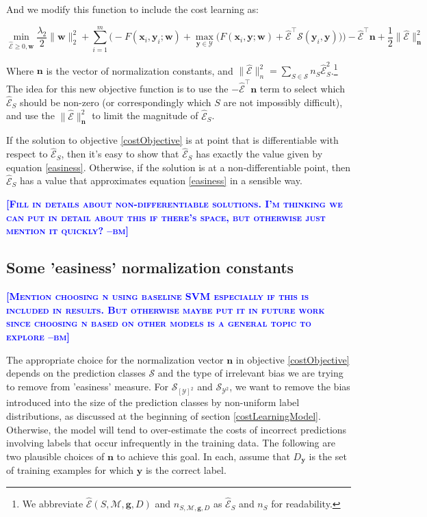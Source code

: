 \documentclass{article} %
\newcommand{\bmcomment}[1]{\textcolor{blue}{\textsc{\textbf{[#1 --bm]}}}}
\begin{document}
And we modify this function to include the cost learning as:

\begin{equation}
\label{costObjective}
\min_{\mathbf{\mathcal{\hat{E}}}\geq 0,\mathbf{w}} \frac{\lambda_2}{2}\|\mathbf{w}\|_2^2 + \sum_{i=1}^m\bigg(-F(\mathbf{x}_i,\mathbf{y}_i;\mathbf{w})+\max_{\mathbf{y}\in \mathcal{Y}}\Big(F(\mathbf{x}_i,\mathbf{y};\mathbf{w})+\mathbf{\mathcal{\hat{E}}}^\top \mathbf{\mathcal{S}}(\mathbf{y}_i,\mathbf{y})\Big)\bigg)-\mathbf{\mathcal{\hat{E}}}^\top\mathbf{n}+\frac{1}{2}\|\mathbf{\mathcal{\hat{E}}}\|^2_\mathbf{n}
\end{equation}

Where $\mathbf{n}$ is the vector of normalization constants, and 
$\|\mathbf{\mathcal{\hat{E}}}\|^2_n=\sum_{S\in\mathcal{S}}n_S\mathcal{\hat{E}}_S^2$.\footnote{
  We abbreviate $\mathcal{\hat{E}}(S,\mathcal{M},\mathbf{g},D)$ and 
 $n_{S,\mathcal{M},\mathbf{g},D}$ as $\mathcal{\hat{E}}_S$ and $n_S$ for 
 readability.
}
The idea for this new objective function is to use the 
$-\mathbf{\mathcal{\hat{E}}}^\top\mathbf{n}$ term to select which 
$\mathcal{\hat{E}}_S$
should be non-zero (or correspondingly which $S$ are not 
impossibly difficult), and use the $\|\mathcal{\hat{E}}\|^2_\mathbf{n}$ 
to limit the magnitude of $\mathcal{\hat{E}}_S$.

If the solution to objective \ref{costObjective} is at point that is 
differentiable with respect to $\mathcal{\hat{E}}_S$, then it's easy to 
show that $\mathcal{\hat{E}}_S$ has exactly the value given by 
equation \ref{easiness}.
Otherwise, if the solution is at a non-differentiable point, then 
$\mathcal{\hat{E}}_S$ has a value that approximates equation \ref{easiness}
in a sensible way.  

\bmcomment{Fill in details about non-differentiable solutions. I'm thinking
we can put in detail about this if there's space, but otherwise just mention
it quickly?}

\subsection{Some 'easiness' normalization constants}

\bmcomment{Mention choosing n using baseline 
SVM especially if this is included in results.  But otherwise
maybe put it in future work since choosing n based on other
models is a general topic to explore}

The appropriate choice for the normalization vector $\mathbf{n}$ in 
objective \ref{costObjective} depends on the prediction classes
$\mathcal{S}$ and the type of irrelevant bias we are trying to
remove from 'easiness' measure. For $\mathcal{S}_{[\mathcal{Y}]^2}$
and $\mathcal{S}_{\mathcal{Y}^2}$, we want to remove the bias introduced
into the size of the prediction classes by non-uniform label 
distributions, as discussed at the beginning of section
\ref{costLearningModel}.  Otherwise, the model will tend to over-estimate
the costs of incorrect predictions involving labels that occur 
infrequently in the training data.  The following are two 
plausible choices of $\mathbf{n}$ to achieve this goal. In each,
assume that $D_\mathbf{y}$ is the set of training examples
for which $\mathbf{y}$ is the correct label.
\end{document}
